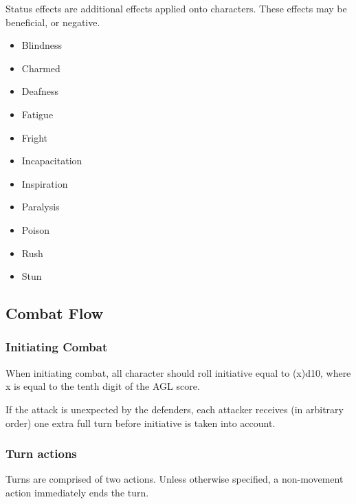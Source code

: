 \documentclass[]{article}
\providecommand{\tightlist}{%
  \setlength{\itemsep}{0pt}\setlength{\parskip}{0pt}}
\begin{document}
Status effects are additional effects applied onto characters. These
effects may be beneficial, or negative.

\begin{itemize}
\tightlist
\item
  Blindness
\item
  Charmed
\item
  Deafness
\item
  Fatigue
\item
  Fright
\item
  Incapacitation
\item
  Inspiration
\item
  Paralysis
\item
  Poison
\item
  Rush
\item
  Stun
\end{itemize}

\subsection{Combat Flow}\label{combat-flow}

\subsubsection{Initiating Combat}\label{initiating-combat}

When initiating combat, all character should roll initiative equal to
(x)d10, where x is equal to the tenth digit of the AGL score.

If the attack is unexpected by the defenders, each attacker receives (in
arbitrary order) one extra full turn before initiative is taken into
account.

\subsubsection{Turn actions}\label{turn-actions}

Turns are comprised of two actions. Unless otherwise specified, a
non-movement action immediately ends the turn.
\end{document}
